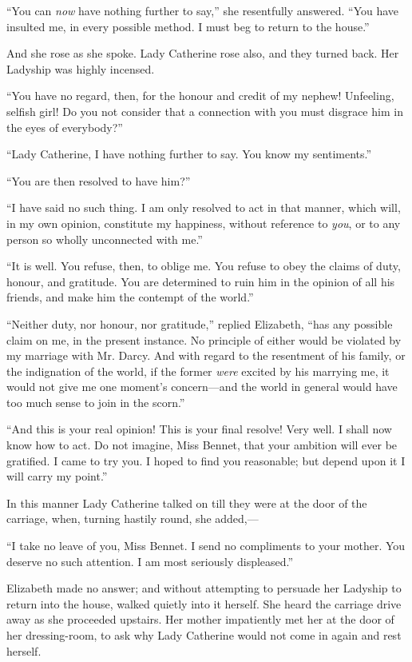 \documentclass[12pt]{book}
\begin{document}
``You can \textit{now} have nothing further to say,'' she resentfully answered. ``You have insulted me, in every possible method. I must beg to return to the house.''

And she rose as she spoke. Lady Catherine rose also, and they turned back. Her Ladyship was highly incensed.

``You have no regard, then, for the honour and credit of my nephew! Unfeeling, selfish girl! Do you not consider that a connection with you must disgrace him in the eyes of everybody?''

``Lady Catherine, I have nothing further to say. You know my sentiments.''

``You are then resolved to have him?''

``I have said no such thing. I am only resolved to act in that manner, which will, in my own opinion, constitute my happiness, without reference to \textit{you}, or to any person so wholly unconnected with me.''

``It is well. You refuse, then, to oblige me. You refuse to obey the claims of duty, honour, and gratitude. You are determined to ruin him in the opinion of all his friends, and make him the contempt of the world.''

``Neither duty, nor honour, nor gratitude,'' replied Elizabeth, ``has any possible claim on me, in the present instance. No principle of either would be violated by my marriage with Mr. Darcy. And with regard to the resentment of his family, or the indignation of the world, if the former \textit{were} excited by his marrying me, it would not give me one moment's concern---and the world in general would have too much sense to join in the scorn.''

``And this is your real opinion! This is your final resolve! Very well. I shall now know how to act. Do not imagine, Miss Bennet, that your ambition will ever be gratified. I came to try you. I hoped to find you reasonable; but depend upon it I will carry my point.''

In this manner Lady Catherine talked on till they were at the door of the carriage, when, turning hastily round, she added,---

``I take no leave of you, Miss Bennet. I send no compliments to your mother. You deserve no such attention. I am most seriously displeased.''

Elizabeth made no answer; and without attempting to persuade her Ladyship to return into the house, walked quietly into it herself. She heard the carriage drive away as she proceeded upstairs. Her mother impatiently met her at the door of her dressing-room, to ask why Lady Catherine would not come in again and rest herself.
\end{document}
